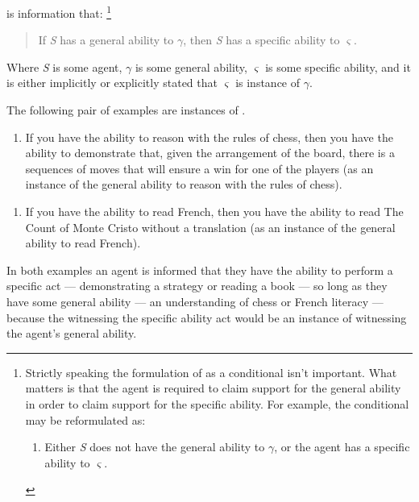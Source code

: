\begin{note}
  \begin{definition}[\gsi{}]
    \Gsi{-} is information that:\nolinebreak
    \footnote{
      Strictly speaking the formulation of \gsi{} as a conditional isn't important.
      What matters is that the agent is required to claim support for the general ability in order to claim support for the specific ability.
      For example, the conditional may be reformulated as:
      \begin{enumerate}[label=(\gsi{}\('\)), ref=(\gsi{}\('\))]
      \item Either \emph{S} does not have the general ability to \(\gamma\), or the agent has a specific ability to \(\varsigma\).
      \end{enumerate}
    }
    \begin{quote}
      If \emph{S} has a general ability to \(\gamma\), then \emph{S} has a specific ability to \(\varsigma\).
    \end{quote}
    Where \emph{S} is some agent, \(\gamma\) is some general ability, \(\varsigma\) is some specific ability, and it is either implicitly or explicitly stated that \(\varsigma\) is instance of \(\gamma\).
  \end{definition}

  The following pair of examples are instances of \gsi{}.
  \begin{enumerate}[label=(\gsi{}:\arabic*), ref=(\gsi{}:\arabic*)]
  \item\label{qe:cond} If you have the ability to reason with the rules of chess, then you have the ability to demonstrate that, given the arrangement of the board, there is a sequences of moves that will ensure a win for one of the players (as an instance of the general ability to reason with the rules of chess).
  \end{enumerate}

  \begin{enumerate}[label=(\gsi{}:\arabic*), ref=(\gsi{}:\arabic*), resume]
  \item\label{qe:cond:french} If you have the ability to read French, then you have the ability to read The Count of Monte Cristo without a translation (as an instance of the general ability to read French).
  \end{enumerate}
  In both examples an agent is informed that they have the ability to perform a specific act --- demonstrating a strategy or reading a book --- so long as they have some general ability --- an understanding of chess or French literacy --- because the witnessing the specific ability act would be an instance of witnessing the agent's general ability.


\end{note}
